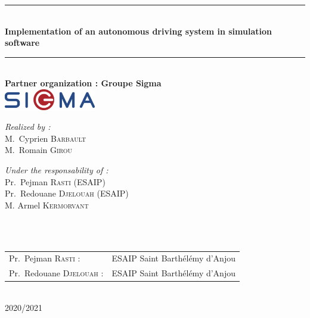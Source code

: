 \begin{titlepage}
\begin{center}
\rule{\linewidth}{0.3mm} \\[0.4cm]
{ \huge \bfseries\color{blue!70!black} Implementation of an autonomous driving system in simulation software \\[0.4cm] }
\rule{\linewidth}{0.3mm} \\[1cm]
{\large \bfseries Partner organization : Groupe Sigma}\\[1cm]
\includegraphics[width=0.3\textwidth]{sigma}\\[1cm]
\noindent
\begin{minipage}{0.4\textwidth}
  \begin{flushleft} \large
    \emph{\color{orange!80!black}Realized by :}\\
    M.~Cyprien \textsc{Barbault}\\
    M.~Romain \textsc{Girou}
  \end{flushleft}
\end{minipage}%
\begin{minipage}{0.5\textwidth}
  \begin{flushright} \large
    \emph{\color{orange!80!black}Under the responsability of :} \\
    Pr.~Pejman \textsc{Rasti} (ESAIP)\\
    Pr.~Redouane \textsc{Djelouah} (ESAIP)\\
    M. Armel \textsc{Kermorvant}\\
  \end{flushright}
\end{minipage}\\[1cm]

\\[0.5cm]

\color{black}
\centering
\begin{tabular}{ll}
\large Pr.~Pejman \textsc{Rasti} : & \large ESAIP Saint Barth\'el\'emy d'Anjou \large \\[0.1cm]
\large Pr.~Redouane \textsc{Djelouah} : & \large ESAIP Saint Barth\'el\'emy d'Anjou \\[0.1cm]
\end{tabular}

\vfill

{\large \color{orange!80!black}{Year}\\ \color{blue!80!black}2020/2021}

\end{center}
\end{titlepage}